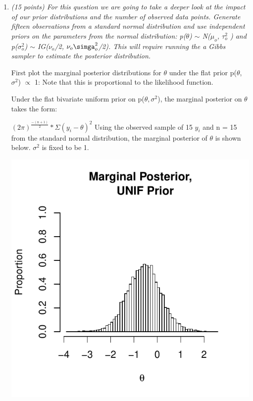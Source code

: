 \documentclass{article}\usepackage[]{graphicx}\usepackage[]{color}
\makeatletter
\def\maxwidth{ %
  \ifdim\Gin@nat@width>\linewidth
    \linewidth
  \else
    \Gin@nat@width
  \fi
}
\newenvironment{knitrout}{}{} %
\makeatother
\begin{document}
\begin{enumerate}
\item%
{\it (15 points) For this question we are going to take a deeper look at the impact of our prior
distributions and the number of observed data points. Generate fifteen observations from a
standard normal distribution and use independent priors on the parameters from the normal
distribution: p($\theta$) $\sim$ N($\mu_{o}$, $\tau_{o}^{2}$ ) and p($\sigma^2_{o}$) $\sim$ IG($\nu_{o}$/2, $\nu_{o}\simga^2_{o}$/2). This will require running the a Gibbs sampler to estimate the posterior distribution.

First plot the marginal posterior distributions for $\theta$ under the flat prior p($\theta$, $\sigma^2$) $\propto$ 1: Note that this is proportional to the likelihood function. }

{\normalfont Under the flat bivariate uniform prior on p($\theta,\sigma^2$), the marginal posterior on $\theta$ takes the form:}

$(2\pi)^{\frac{-(n+1)}{2}} * \Sigma(y_{i} - \theta)^{2}$ {\normalfont Using the observed sample of 15 $y_{i}$ and n = 15 from the standard normal distribution, the marginal posterior of $\theta$ is shown below. $\sigma^2$ is fixed to be 1.}


\begin{knitrout}
\color{fgcolor}

{\centering \includegraphics[width=\maxwidth]{figure/prob1-1} 

}
\end{knitrout}
\end{enumerate}
\end{document}
